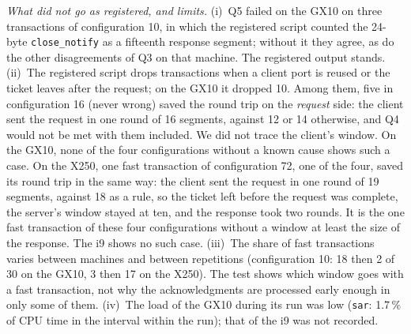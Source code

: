 \documentclass[9pt]{article}
\begin{document}
\emph{What did not go as registered, and limits.} (i)~Q5 failed on the GX10 on three transactions of configuration 10, in which the registered script counted the 24-byte \texttt{close\_notify} as a fifteenth response segment; without it they agree, as do the other disagreements of Q3 on that machine. The registered output stands. (ii)~The registered script drops transactions when a client port is reused or the ticket leaves after the request; on the GX10 it dropped 10. Among them, five in configuration 16 (never wrong) saved the round trip on the \emph{request} side: the client sent the request in one round of 16 segments, against 12 or 14 otherwise, and Q4 would not be met with them included. We did not trace the client's window. On the GX10, none of the four configurations without a known cause shows such a case. On the X250, one fast transaction of configuration 72, one of the four, saved its round trip in the same way: the client sent the request in one round of 19 segments, against 18 as a rule, so the ticket left before the request was complete, the server's window stayed at ten, and the response took two rounds. It is the one fast transaction of these four configurations without a window at least the size of the response. The i9 shows no such case. (iii)~The share of fast transactions varies between machines and between repetitions (configuration 10: 18 then 2 of 30 on the GX10, 3 then 17 on the X250). The test shows which window goes with a fast transaction, not why the acknowledgments are processed early enough in only some of them. (iv)~The load of the GX10 during its run was low (\texttt{sar}: 1.7\,\% of CPU time in the interval within the run); that of the i9 was not recorded.
\end{document}
